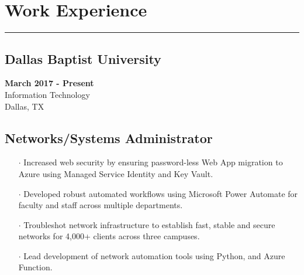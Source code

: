 \documentclass[10pt]{article}
\begin{document}
\section*{Work Experience}
\vspace{-.6cm}
\par\noindent\textcolor{black}{\rule{\textwidth}{.5pt}} 
\vspace{-.8cm}
\begin{paracol}{2}
    \begin{leftcolumn} 
        \sloppy
        \subsection*{Dallas Baptist University}
        \textbf{March 2017 -  Present} \\
        Information Technology \\
        Dallas, TX
    \end{leftcolumn}

    \begin{rightcolumn} 
        \subsection*{Networks/Systems Administrator}
        \begin{itemize}[leftmargin=.28cm, itemsep=1pt]
            \item[$\cdot$] Increased web security by ensuring password-less Web App migration to Azure using Managed Service Identity and Key Vault.
            \item[$\cdot$] Developed robust automated workflows using Microsoft Power Automate for faculty and staff across multiple departments.
            \item[$\cdot$] Troubleshot network infrastructure to establish fast, stable and secure networks for 4,000+ clients across three campuses. 
            \item[$\cdot$] Lead development of network automation tools using Python, and Azure Function.
        \end{itemize}
    \end{rightcolumn}
\end{paracol}
\vspace{-.6cm}
\end{document}
